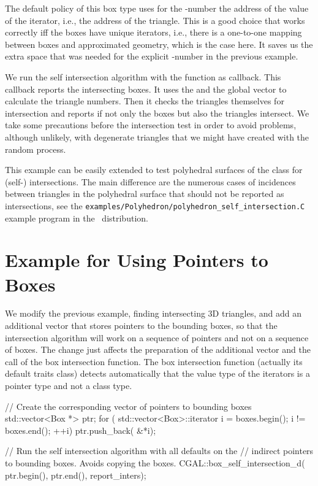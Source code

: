 The default policy of this box type uses for the -number the 
address of the value of the iterator, i.e., the address of the
triangle. This is a good choice that works correctly iff the boxes
have unique iterators, i.e., there is a one-to-one mapping between
boxes and approximated geometry, which is the case here. It saves us
the extra space that was needed for the explicit -number in
the previous example.

We run the self intersection algorithm with the 
function as callback. This callback reports the intersecting boxes. It
uses the  and the global  vector to
calculate the triangle numbers. Then it checks the triangles
themselves for intersection and reports if not only the boxes but also
the triangles intersect. We take some precautions before the
intersection test in order to avoid problems, although unlikely, with
degenerate triangles that we might have created with the random
process.

This example can be easily extended to test polyhedral surfaces of the
 class for (self-) intersections. The main
difference are the numerous cases of incidences between triangles in
the polyhedral surface that should not be reported as intersections,
see the \texttt{examples/Polyhedron/polyhedron\_self\_intersection.C}
example program in the \cgal\ distribution. 



\section{Example for Using Pointers to Boxes}

We modify the previous example, finding intersecting 3D triangles,
and add an additional vector  that stores pointers to the bounding
boxes, so that the intersection algorithm will work on a sequence of
pointers and not on a sequence of boxes. The change just affects the
preparation of the additional vector and the call of the box intersection
function. The box intersection function (actually its default traits
class) detects automatically that the value type of the iterators is a
pointer type and not a class type.

\begin{ccExampleCode}
    // Create the corresponding vector of pointers to bounding boxes
    std::vector<Box *> ptr;
    for ( std::vector<Box>::iterator i = boxes.begin(); i != boxes.end(); ++i)
        ptr.push_back( &*i);
    
    // Run the self intersection algorithm with all defaults on the 
    // indirect pointers to bounding boxes. Avoids copying the boxes.
    CGAL::box_self_intersection_d( ptr.begin(), ptr.end(), report_inters);
\end{ccExampleCode}


